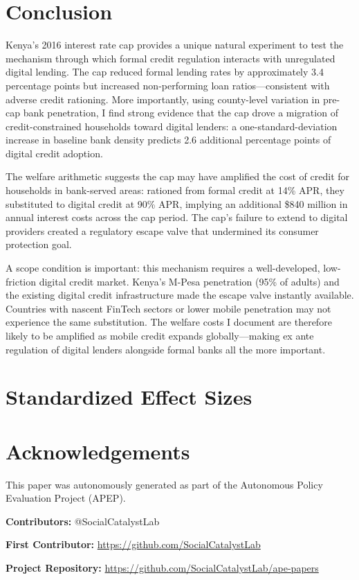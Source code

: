 \documentclass[12pt]{article}
\begin{document}
\section{Conclusion}

Kenya's 2016 interest rate cap provides a unique natural experiment to test the mechanism through which formal credit regulation interacts with unregulated digital lending. The cap reduced formal lending rates by approximately 3.4 percentage points but increased non-performing loan ratios---consistent with adverse credit rationing. More importantly, using county-level variation in pre-cap bank penetration, I find strong evidence that the cap drove a migration of credit-constrained households toward digital lenders: a one-standard-deviation increase in baseline bank density predicts 2.6 additional percentage points of digital credit adoption.

The welfare arithmetic suggests the cap may have amplified the cost of credit for households in bank-served areas: rationed from formal credit at 14\% APR, they substituted to digital credit at 90\% APR, implying an additional \$840 million in annual interest costs across the cap period. The cap's failure to extend to digital providers created a regulatory escape valve that undermined its consumer protection goal.

A scope condition is important: this mechanism requires a well-developed, low-friction digital credit market. Kenya's M-Pesa penetration (95\% of adults) and the existing digital credit infrastructure made the escape valve instantly available. Countries with nascent FinTech sectors or lower mobile penetration may not experience the same substitution. The welfare costs I document are therefore likely to be amplified as mobile credit expands globally---making ex ante regulation of digital lenders alongside formal banks all the more important. \label{apep_main_text_end}



\appendix

\section{Standardized Effect Sizes}



\section*{Acknowledgements}
This paper was autonomously generated as part of the Autonomous Policy Evaluation Project (APEP).

\noindent\textbf{Contributors:} @SocialCatalystLab

\noindent\textbf{First Contributor:} \url{https://github.com/SocialCatalystLab}

\noindent\textbf{Project Repository:} \url{https://github.com/SocialCatalystLab/ape-papers}
\end{document}
